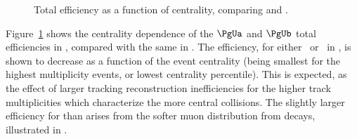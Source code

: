 \begin{figure}[h!]
  \begin{center}
  
   

    \caption{Total efficiency as a function of centrality, comparing \PbPb and \pp.}
    \label{fig:EffCent}
  \end{center}
\end{figure}


Figure~\ref{fig:EffCent} shows the centrality dependence of the ${\PgUa}$ and ${\PgUb}$ total efficiencies in \PbPb, compared with the same in \pp.
%
The efficiency, for either \PgUa\ or \PgUb\ in \PbPb, is shown to decrease as a function of the event centrality (being smallest for the highest multiplicity events, or lowest centrality percentile). This is expected, as the effect of larger tracking reconstruction inefficiencies for the higher track multiplicities which characterize the more central collisions. 
%
The slightly larger efficiency for \PgUb than \PgUa arises from the softer muon distribution from \PgUa decays, illustrated in . 

